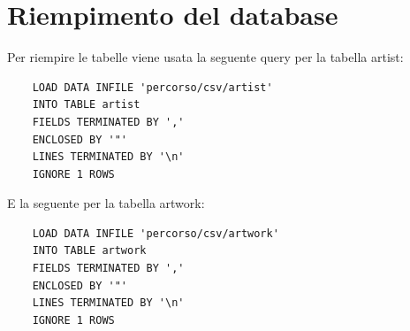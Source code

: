 \documentclass{ol-softwaremanual}
\begin{document}
\section{Riempimento del database}
Per riempire le tabelle viene usata la seguente query per la tabella artist:
\begin{verbatim}
    LOAD DATA INFILE 'percorso/csv/artist'
    INTO TABLE artist
    FIELDS TERMINATED BY ','
    ENCLOSED BY '"'
    LINES TERMINATED BY '\n'
    IGNORE 1 ROWS
\end{verbatim}
E la seguente per la tabella artwork:
\begin{verbatim}
    LOAD DATA INFILE 'percorso/csv/artwork'
    INTO TABLE artwork
    FIELDS TERMINATED BY ','
    ENCLOSED BY '"'
    LINES TERMINATED BY '\n'
    IGNORE 1 ROWS
\end{verbatim}
\end{document}
